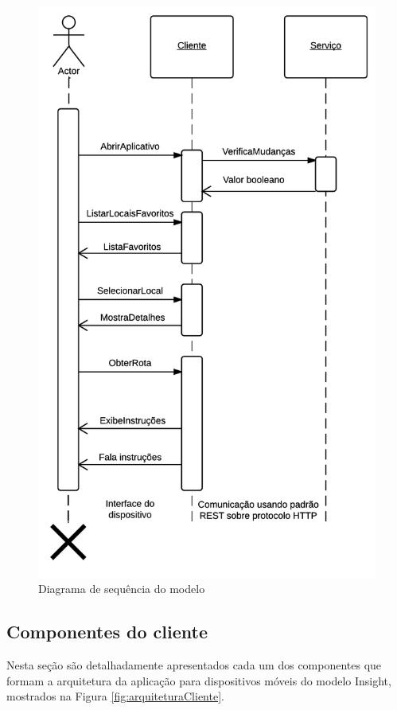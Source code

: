 \documentclass[english,brazilian]{UNISINOSmonografia}
\begin{document}
\begin{figure}[!ht]
	\caption{Diagrama de sequência do modelo}
	\label{fig:diagramaSequencia}
	\centering%
	\begin{minipage}{.5\textwidth}
		\includegraphics[width=\textwidth]{imgs/diagramaSequencia.png}
	\end{minipage}
\end{figure}


	\subsection{Componentes do cliente}
Nesta seção são detalhadamente apresentados cada um dos componentes que formam a arquitetura da aplicação para dispositivos móveis do modelo Insight, mostrados na Figura \ref{fig:arquiteturaCliente}.
\end{document}
